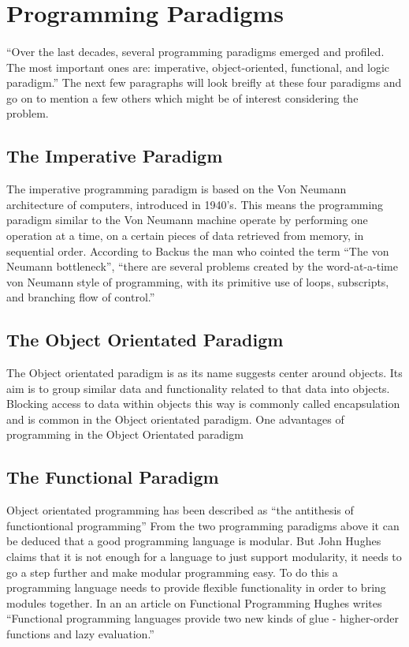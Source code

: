 \documentclass{report}
\begin{document}
\section{Programming Paradigms}
\paragraph{}``Over the last decades, several programming paradigms emerged and profiled. The most important ones are: imperative, object-oriented, functional, and logic paradigm.''\cite{Vujosevic2008} The next few paragraphs will look breifly at these four paradigms and go on to mention a few others which might be of interest considering the problem.

\subsection{The Imperative Paradigm}
The imperative programming paradigm is based on the Von Neumann architecture of computers, introduced in 1940’s. \cite{Vujosevic2008} This means the programming paradigm similar to the Von Neumann machine operate by performing one operation at a time, on a certain pieces of data retrieved from memory, in sequential order. According to Backus \cite{Backus1978} the man who cointed the term ``The von Neumann bottleneck'', ``there are several problems created by the word-at-a-time von Neumann style of programming, with its primitive use of loops, subscripts, and branching flow of control.''

\subsection{The Object Orientated Paradigm}
The Object orientated paradigm is as its name suggests center around objects. Its aim is to group similar data and functionality related to that data into objects. Blocking access to data within objects this way is commonly called encapsulation and is common in the Object orientated paradigm.
One advantages of programming in the Object Orientated paradigm %

\subsection{The Functional Paradigm}
Object orientated programming has been described as ``the antithesis of functiontional programming'' \cite{Taivalsaari1993} From the two programming paradigms above it can be deduced that a good programming language is modular. But John Hughes claims that it is not enough for a language to just support modularity, it needs to go a step further and make modular programming easy. To do this a programming language needs to provide flexible functionality in order to bring modules together. In an an article on Functional Programming Hughes writes ``Functional programming languages provide two new kinds of glue - higher-order functions and lazy evaluation.''\cite{Hughes1984} %
\end{document}
